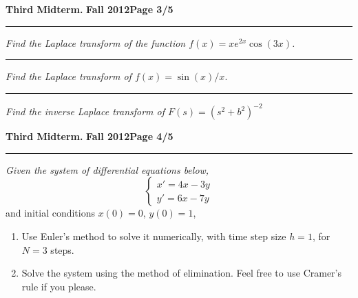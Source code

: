 \documentclass[12pt]{article}
\begin{document}
\newpage
\hfill{\large\bf Third Midterm.}\hfill{\large\bf
  Fall 2012}\hfill{\large\bf Page 3/5}\hrule

\bigskip
{\problem[10pts] \em Find the Laplace transform of the function
$f(x)=xe^{2x}\cos(3x)$.}
\vspace{4cm}
\begin{flushright}
\end{flushright}
\hrule
{\problem[10pts] \em Find the Laplace transform of $f(x)=\sin(x)/x.$}
\vspace{4cm}
\begin{flushright}
\end{flushright}
\hrule
{\problem[20pts] \em Find the inverse Laplace transform of
  $F(s)=(s^2+b^2)^{-2}$}
\vspace{8cm}
\begin{flushright}
\end{flushright}
\newpage

\hfill{\large\bf Third Midterm.}\hfill{\large\bf
  Fall 2012}\hfill{\large\bf Page 4/5}\hrule

\bigskip
{\problem[25pts] \em Given the system of differential equations below,}
\begin{equation*}
\begin{cases}
x'= 4x-3y\\ y'=6x-7y
\end{cases}
\end{equation*}
and initial conditions $x(0)=0$, $y(0)=1$,
\begin{enumerate}
\item Use Euler's method to solve it numerically, with time step size
$h=1$, for $N=3$ steps.
\item Solve the system using the method of elimination.  Feel free to
use Cramer's rule if you please.
\end{enumerate}
\newpage
\end{document}
